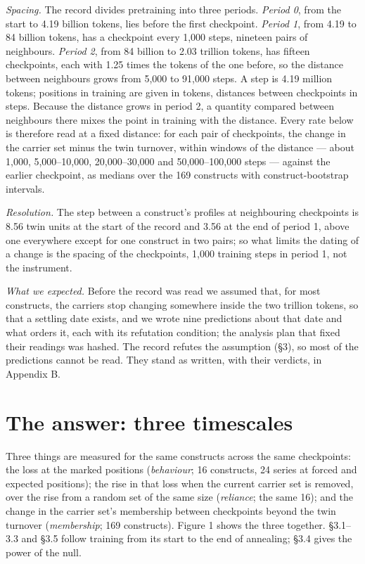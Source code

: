 \documentclass{article}
\begin{document}
\emph{Spacing.} The record divides pretraining into three periods. \emph{Period 0}, from the start to 4.19 billion tokens, lies before the first checkpoint. \emph{Period 1}, from 4.19 to 84 billion tokens, has a checkpoint every 1,000 steps, nineteen pairs of neighbours. \emph{Period 2}, from 84 billion to 2.03 trillion tokens, has fifteen checkpoints, each with 1.25 times the tokens of the one before, so the distance between neighbours grows from 5,000 to 91,000 steps. A step is 4.19 million tokens; positions in training are given in tokens, distances between checkpoints in steps. Because the distance grows in period 2, a quantity compared between neighbours there mixes the point in training with the distance. Every rate below is therefore read at a fixed distance: for each pair of checkpoints, the change in the carrier set minus the twin turnover, within windows of the distance --- about 1,000, 5,000--10,000, 20,000--30,000 and 50,000--100,000 steps --- against the earlier checkpoint, as medians over the 169 constructs with construct-bootstrap intervals.

\emph{Resolution.} The step between a construct's profiles at neighbouring checkpoints is 8.56 twin units at the start of the record and 3.56 at the end of period 1, above one everywhere except for one construct in two pairs; so what limits the dating of a change is the spacing of the checkpoints, 1,000 training steps in period 1, not the instrument.

\emph{What we expected.} Before the record was read we assumed that, for most constructs, the carriers stop changing somewhere inside the two trillion tokens, so that a settling date exists, and we wrote nine predictions about that date and what orders it, each with its refutation condition; the analysis plan that fixed their readings was hashed. The record refutes the assumption (\S3), so most of the predictions cannot be read. They stand as written, with their verdicts, in Appendix B.

\section{The answer: three timescales}

Three things are measured for the same constructs across the same checkpoints: the loss at the marked positions (\emph{behaviour}; 16 constructs, 24 series at forced and expected positions); the rise in that loss when the current carrier set is removed, over the rise from a random set of the same size (\emph{reliance}; the same 16); and the change in the carrier set's membership between checkpoints beyond the twin turnover (\emph{membership}; 169 constructs). Figure 1 shows the three together. \S3.1--3.3 and \S3.5 follow training from its start to the end of annealing; \S3.4 gives the power of the null.
\end{document}
